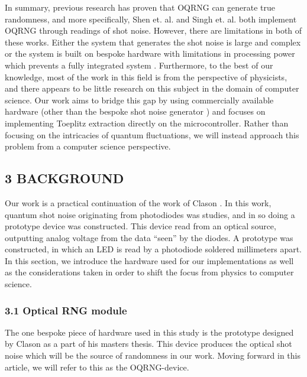In summary, previous research has proven that OQRNG can generate true randomness, and more specifically, Shen et. al. \cite{contender1} and Singh et. al. \cite{singh} both implement OQRNG through readings of shot noise. However, there are limitations in both of these works. Either the system that generates the shot noise is large and complex \cite{contender1} or the system is built on bespoke hardware with limitations in processing power which prevents a fully integrated system \cite{singh}. Furthermore, to the best of our knowledge, most of the work in this field is from the perspective of physicists, and there appears to be little research on this subject in the domain of computer science. Our work aims to bridge this gap by using commercially available hardware (other than the bespoke shot noise generator \cite{Clason2023}) and focuses on implementing Toeplitz extraction directly on the microcontroller. Rather than focusing on the intricacies of quantum fluctuations, we will instead approach this problem from a computer science perspective.

\hypertarget{background}{%
\subsection{3 BACKGROUND}\label{background}}

Our work is a practical continuation of the work of Clason \cite{Clason2023}. In this work, quantum shot noise originating from photodiodes was studies, and in so doing a prototype device was constructed. This device read from an optical source, outputting analog voltage from the data ``seen'' by the diodes. A prototype was constructed, in which an LED is read by a photodiode soldered millimeters apart. In this section, we introduce the hardware used for our implementations as well as the considerations taken in order to shift the focus from physics to computer science.

\hypertarget{optical-rng-module}{%
\subsubsection{3.1 Optical RNG module}\label{optical-rng-module}}

The one bespoke piece of hardware used in this study is the prototype designed by Clason \cite{Clason2023} as a part of his masters thesis. This device produces the optical shot noise which will be the source of randomness in our work. Moving forward in this article, we will refer to this as the OQRNG-device.

